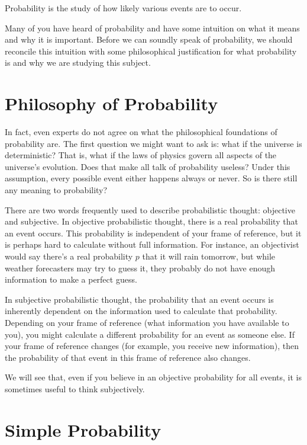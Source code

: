 \documentclass[a4paper,10pt]{report}
\begin{document}
Probability is the study of how likely various events are to occur.

Many of you have heard of probability and have some intuition on what it means and why it is
important. Before we can soundly speak of probability, we should reconcile this intuition
with some philosophical justification for what probability is and why we are studying this
subject.

\section{Philosophy of Probability}

In fact, even experts do not agree on what the philosophical foundations of probability are.
The first question we might want to ask is: what if the universe is deterministic? That is,
what if the laws of physics govern all aspects of the universe's evolution. Does that make
all talk of probability useless? Under this assumption, every possible event either happens
always or never. So is there still any meaning to probability?

There are two words frequently used to describe probabilistic thought: objective and
subjective. In objective probabilistic thought, there is a real probability that an event
occurs. This probability is independent of your frame of reference, but it is perhaps hard
to calculate without full information. For instance, an objectivist would say there's a real
probability \(p\) that it will rain tomorrow, but while weather forecasters may try to guess
it, they probably do not have enough information to make a perfect guess.

In subjective probabilistic thought, the probability that an event occurs is inherently
dependent on the information used to calculate that probability. Depending on your frame of
reference (what information you have available to you), you might calculate a different
probability for an event as someone else. If your frame of reference changes (for example,
you receive new information), then the probability of that event in this frame of reference
also changes.

We will see that, even if you believe in an objective probability for all events, it is
sometimes useful to think subjectively.

\section{Simple Probability}
\end{document}
